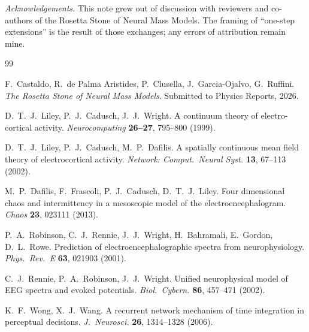 \documentclass[11pt,a4paper]{article}
\begin{document}
\bigskip

\noindent\textit{Acknowledgements.} This note grew out of discussion with reviewers and co-authors of the Rosetta Stone of Neural Mass Models. The framing of ``one-step extensions'' is the result of those exchanges; any errors of attribution remain mine.



\iffalse
\begin{thebibliography}{99}

F.~Castaldo, R.~de Palma Aristides, P.~Clusella, J.~Garcia-Ojalvo, G.~Ruffini.
\emph{The Rosetta Stone of Neural Mass Models}.
Submitted to Physics Reports, 2026.

D.~T.~J.~Liley, P.~J.~Cadusch, J.~J.~Wright.
A continuum theory of electro-cortical activity.
\emph{Neurocomputing} \textbf{26--27}, 795--800 (1999).

D.~T.~J.~Liley, P.~J.~Cadusch, M.~P.~Dafilis.
A spatially continuous mean field theory of electrocortical activity.
\emph{Network: Comput.\ Neural Syst.} \textbf{13}, 67--113 (2002).

M.~P.~Dafilis, F.~Frascoli, P.~J.~Cadusch, D.~T.~J.~Liley.
Four dimensional chaos and intermittency in a mesoscopic model of the electroencephalogram.
\emph{Chaos} \textbf{23}, 023111 (2013).

P.~A.~Robinson, C.~J.~Rennie, J.~J.~Wright, H.~Bahramali, E.~Gordon, D.~L.~Rowe.
Prediction of electroencephalographic spectra from neurophysiology.
\emph{Phys.\ Rev.\ E} \textbf{63}, 021903 (2001).

C.~J.~Rennie, P.~A.~Robinson, J.~J.~Wright.
Unified neurophysical model of EEG spectra and evoked potentials.
\emph{Biol.\ Cybern.} \textbf{86}, 457--471 (2002).

K.~F.~Wong, X.~J.~Wang.
A recurrent network mechanism of time integration in perceptual decisions.
\emph{J.\ Neurosci.} \textbf{26}, 1314--1328 (2006).


\end{thebibliography}
\end{document}
